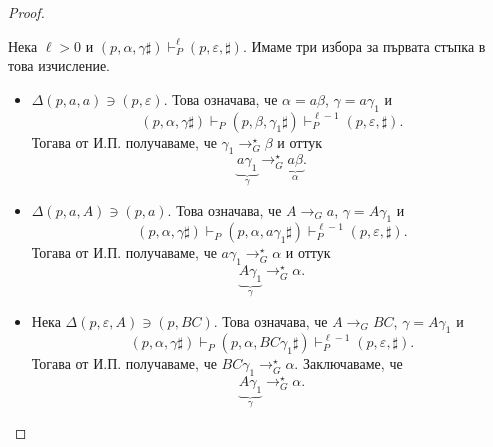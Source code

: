 \begin{proof}
\begin{enumerate}[(a)]
    Нека $\ell > 0$ и $(p, \alpha, \gamma \sharp) \vdash^{\ell}_P (p, \varepsilon, \sharp)$.
    Имаме три избора за първата стъпка в това изчисление.
    \begin{itemize}
    \item
      $\Delta(p,a,a) \ni (p,\varepsilon)$.
      Това означава, че $\alpha = a\beta$, $\gamma = a\gamma_1$ и
      \[(p, \alpha, \gamma \sharp) \vdash_P (p,\beta,\gamma_1\sharp ) \vdash^{\ell-1}_P (p, \varepsilon, \sharp).\]
      Тогава от И.П. получаваме, че $\gamma_1 \to^\star_G \beta$ и оттук
      \[\underbrace{a \gamma_1}_{\gamma} \to^\star_G \underbrace{a\beta}_{\alpha}.\]
    \item
      $\Delta(p,a,A) \ni (p,a)$. Това означава, че $A \to_G a$, $\gamma = A\gamma_1$ и
      \[(p, \alpha, \gamma \sharp) \vdash_P (p,\alpha,a\gamma_1\sharp ) \vdash^{\ell-1}_P (p, \varepsilon, \sharp).\]
      Тогава от И.П. получаваме, че $a\gamma_1 \to^\star_G \alpha$ и оттук
      \[\underbrace{A\gamma_1}_{\gamma} \to^\star_G \alpha.\]
    \item
      Нека $\Delta(p,\varepsilon,A) \ni (p,BC)$. Това означава, че $A \to_G BC$, $\gamma = A\gamma_1$ и
      \[(p, \alpha, \gamma \sharp) \vdash_P (p,\alpha, BC\gamma_1\sharp ) \vdash^{\ell-1}_P (p, \varepsilon, \sharp).\]
      Тогава от И.П. получаваме, че
      $BC\gamma_1 \to^\star_G \alpha$. Заключаваме, че
      \[ \underbrace{A\gamma_1}_{\gamma}\to^\star_G \alpha.\]
    \end{itemize}
  \end{enumerate}
\end{proof}

